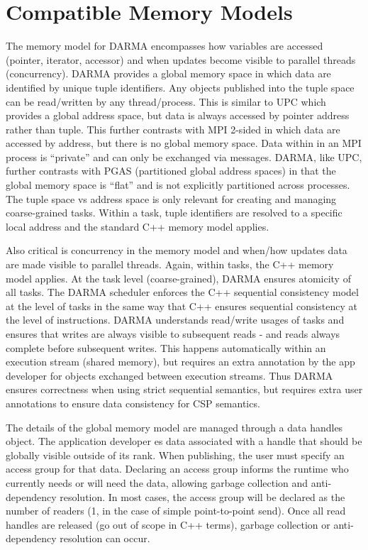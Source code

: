 
\section{Compatible Memory Models}
\label{sec:mem_model}

The memory model for DARMA encompasses how variables are accessed (pointer, iterator, accessor) and when updates become visible to parallel threads (concurrency).  
DARMA provides a global memory space in which data are identified by unique tuple identifiers.  
Any objects published into the tuple space can be read/written by any thread/process. 
This is similar to UPC which provides a global address space, but data is always accessed by pointer address rather than tuple. 
This further contrasts with MPI 2-sided in which data are accessed by address, but there is no global memory space.  
Data within in an MPI process is ``private'' and can only be exchanged via messages.  
DARMA, like UPC, further contrasts with PGAS (partitioned global address spaces) in that the global memory space is ``flat'' and is not explicitly partitioned across processes.
The tuple space vs address space is only relevant for creating and managing coarse-grained tasks. 
Within a task, tuple identifiers are resolved to a specific local address and the standard C++ memory model applies.

Also critical is concurrency in the memory model and when/how updates data are made visible to parallel threads.  
Again, within tasks, the C++ memory model applies.  
At the task level (coarse-grained), DARMA ensures atomicity of all tasks. 
The DARMA scheduler enforces the C++ sequential consistency model at the level of tasks in the same way that C++ ensures sequential consistency at the level of instructions. 
DARMA understands read/write usages of tasks and ensures that writes are always visible to subsequent reads - and reads always complete before subsequent writes.  
This happens automatically within an execution stream (shared memory), but requires an extra annotation by the app developer for objects exchanged between execution streams. Thus DARMA ensures correctness when using strict sequential semantics, but requires extra user annotations to ensure data consistency for CSP semantics.

The details of the global memory model are managed through a data \glspl{handle} object.  
The application developer es data associated with a handle that should be globally visible
outside of its \gls{rank}.  
When publishing, the user must specify an \gls{access group} for that data.  
Declaring an access group informs the runtime who currently needs or will need the data,  
allowing garbage collection and \gls{anti-dependency} resolution.
In most cases, the access group will be declared as the number of readers (1, in the case of simple point-to-point send).
Once all read handles are released (go out of scope in C++ terms), garbage collection or anti-dependency resolution can occur.




